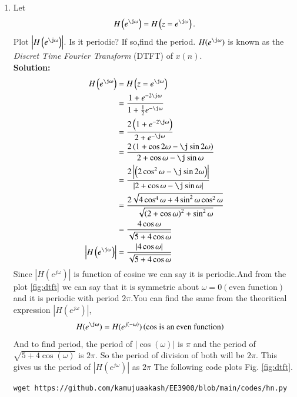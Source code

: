 \documentclass[journal,12pt,twocolumn]{IEEEtran}
\newcommand{\solution}{\noindent \textbf{Solution: }}
\providecommand{\brak}[1]{\ensuremath{\left(#1\right)}}
\providecommand{\abs}[1]{\left\vert#1\right\vert}
\numberwithin{equation}{section}
\renewcommand\thesection{\arabic{section}}
\begin{document}
\begin{enumerate}[label=\thesection.\arabic*]
%
\item 
Let
\begin{equation}
H\brak{e^{\j \omega}} = H\brak{z = e^{\j \omega}}.
\end{equation}
Plot $\abs{H\brak{e^{\j \omega}}}$. Is it periodic? If so,find the period. $H(e^{\j \omega})$ is
known as the {\em Discret Time Fourier Transform} (DTFT) of $x(n)$.
\\
\solution 
\begin{align}
H\brak{e^{\j \omega}} &= H\brak{z = e^{\j \omega}}\\
&= \frac{1 + e^{-2 \j \omega}}{1 + \frac{1}{2} e^{-\j \omega}}\\
&= \frac{2\brak{1 + e^{-2 \j \omega}}}{2 + e^{-\j \omega}}\\
&= \frac{2\brak{1 + \cos{2 \omega}-\j \sin{2\omega}}}{2 + \cos{\omega}-\j \sin{ \omega}}\\
&= \frac{2\abs{\brak{2\cos^2 \omega-\j \sin{2\omega}}}}{\abs{2 + \cos{\omega}-\j \sin{ \omega}}}\\
&= \frac{2\sqrt{4\cos^4 \omega+4\sin^2 \omega \cos^2 \omega}}{\sqrt{\brak{2 + \cos \omega}^2+ \sin^2 \omega }}\\
&=\frac{4\cos\omega}{\sqrt{5 + 4\cos \omega}}\\
\abs{H\brak{e^{\j \omega}} }&=\frac{\abs{4\cos\omega}}{\sqrt{5 + 4\cos \omega}}
\end{align}
Since $\abs{H(e^{j\omega})}$ is function of cosine we can say it is periodic.And from the plot \ref{fig:dtft} we can say that it is symmetric about $\omega = 0\brak{\text{even function}}$ and it is periodic with period $2\pi$.You can find the same from the theoritical expression $\abs{H\brak{e^{j \omega}}}$, 
       \begin{align}
         H(e^{\j \omega}) &= H(e^{j(-\omega)})\brak{\text{cos is an even function}}
       \end{align}
    And to find period, the period of $\abs{\cos(\omega)}$ is $\pi$ and the period of $\sqrt{5 + 4\cos\brak{\omega}}$ is $2\pi$. So the period of division of both will be $2\pi$.
     This gives us the period of $\abs{H(e^{j\omega})}$ as $2\pi$
 The following code plots Fig. \ref{fig:dtft}.
\begin{lstlisting}
wget https://github.com/kamujuaakash/EE3900/blob/main/codes/hn.py
\end{lstlisting}
\begin{figure}[!ht]
\centering

\end{figure}
\end{enumerate}
\end{document}
